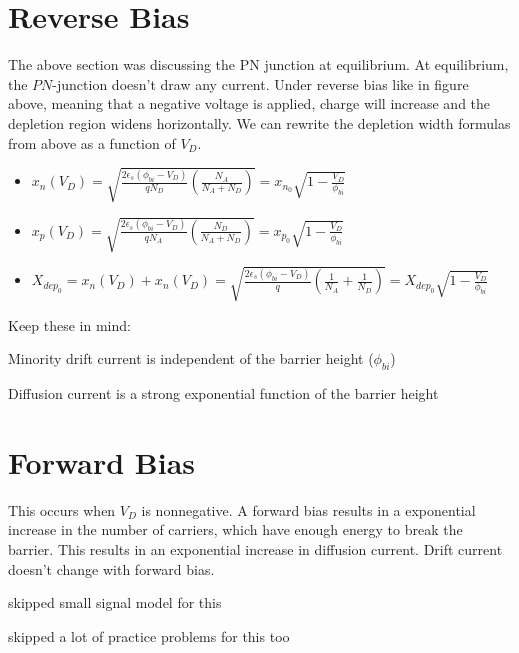 \section{Reverse Bias}

The above section was discussing the PN junction at equilibrium. At equilibrium, the $PN$-junction doesn't draw any current. Under reverse bias like in figure above, meaning that a negative voltage is applied, charge will increase and the depletion region widens horizontally. We can rewrite the depletion width formulas from above as a function of $V_D$.
\begin{itemize}
    \item[] {\Large $x_n(V_D) = \sqrt{\frac{2 \epsilon_s (\phi_{bi} - V_D)}{q N_D} (\frac{N_A}{N_A + N_D})} = x_{n_0} \sqrt{1 - \frac{V_D}{\phi_{bi}}}$}
    
    \item[] {\Large $x_p(V_D) = \sqrt{\frac{2 \epsilon_s (\phi_{bi} - V_D)}{q N_A} (\frac{N_D}{N_A + N_D})} = x_{p_0} \sqrt{1 - \frac{V_D}{\phi_{bi}}}$}

    \item[] {\Large $X_{dep_0} = x_n(V_D) + x_n(V_D) = \sqrt{\frac{2 \epsilon_s (\phi_{bi} - V_D)}{q}(\frac{1}{N_A} + \frac{1}{N_D})} = X_{dep_0} \sqrt{1 - \frac{V_D}{\phi_{bi}}}$}
\end{itemize}
Keep these in mind: 
\begin{pline}
    \item Minority drift current is independent of the barrier height ($\phi_{bi}$)
    \item Diffusion current is a strong exponential function of the barrier height
\end{pline}

\section{Forward Bias}
This occurs when $V_D$ is nonnegative. A forward bias results in a exponential increase in the number of carriers, which have enough energy to break the barrier. This results in an exponential increase in diffusion current. Drift current doesn't change with forward bias. 

\begin{todo}
    \item skipped small signal model for this
    \item skipped a lot of practice problems for this too
\end{todo}

